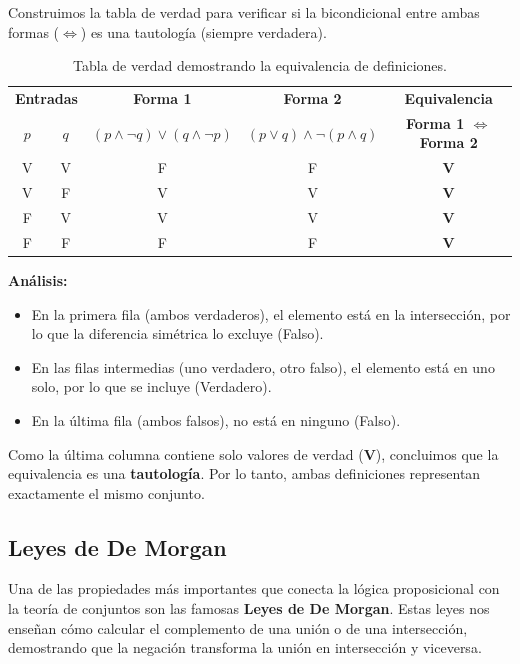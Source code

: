 Construimos la tabla de verdad para verificar si la bicondicional entre ambas formas ($\iff$) es una tautología (siempre verdadera).

\begin{table}[ht]
\centering
\renewcommand{\arraystretch}{1.3} %
\begin{tabular}{|c|c||c|c||c|}
\hline
\multicolumn{2}{|c||}{\textbf{Entradas}} & \textbf{Forma 1} & \textbf{Forma 2} & \textbf{Equivalencia} \\
$p$ & $q$ & $(p \land \neg q) \lor (q \land \neg p)$ & $(p \lor q) \land \neg(p \land q)$ & \textbf{Forma 1 $\iff$ Forma 2} \\ \hline
V & V & F & F & \textbf{V} \\ \hline
V & F & V & V & \textbf{V} \\ \hline
F & V & V & V & \textbf{V} \\ \hline
F & F & F & F & \textbf{V} \\ \hline
\end{tabular}
\caption{Tabla de verdad demostrando la equivalencia de definiciones.}
\end{table}

\noindent \textbf{Análisis:}
\begin{itemize}
    \item En la primera fila (ambos verdaderos), el elemento está en la intersección, por lo que la diferencia simétrica lo excluye (Falso).
    \item En las filas intermedias (uno verdadero, otro falso), el elemento está en uno solo, por lo que se incluye (Verdadero).
    \item En la última fila (ambos falsos), no está en ninguno (Falso).
\end{itemize}

Como la última columna contiene solo valores de verdad (\textbf{V}), concluimos que la equivalencia es una \textbf{tautología}. Por lo tanto, ambas definiciones representan exactamente el mismo conjunto.

\subsection{Leyes de De Morgan}

Una de las propiedades más importantes que conecta la lógica proposicional con la teoría de conjuntos son las famosas \textbf{Leyes de De Morgan}. Estas leyes nos enseñan cómo calcular el complemento de una unión o de una intersección, demostrando que la negación transforma la unión en intersección y viceversa.

